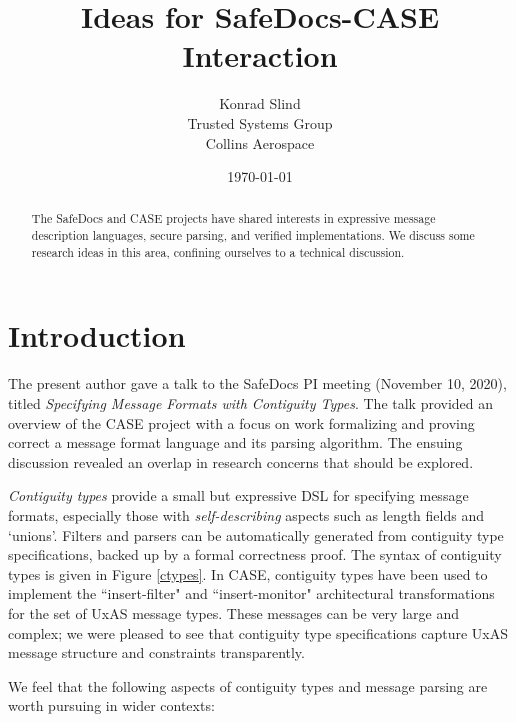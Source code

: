 \documentclass{article}
\theoremstyle{definition}
\begin{document}
\title{Ideas for SafeDocs-CASE Interaction}
\author{Konrad Slind \\ Trusted Systems Group \\ Collins Aerospace}
\date{\today}

\begin{abstract}
The SafeDocs and CASE projects have shared interests in expressive
message description languages, secure parsing, and verified
implementations. We discuss some research ideas in this area,
confining ourselves to a technical discussion.
\end{abstract}

\maketitle

\section*{Introduction}

The present author gave a talk to the SafeDocs PI meeting (November
10, 2020), titled \emph{Specifying Message Formats with Contiguity
  Types}. The talk provided an overview of the CASE project with a
focus on work formalizing and proving correct a message format
language and its parsing algorithm. The ensuing discussion revealed an
overlap in research concerns that should be explored.

\emph{Contiguity types} provide a small but expressive DSL for
specifying message formats, especially those with
\emph{self-describing} aspects such as length fields and
`unions'. Filters and parsers can be automatically generated from
contiguity type specifications, backed up by a formal correctness
proof. The syntax of contiguity types is given in Figure \ref{ctypes}.
In CASE, contiguity types have been used to implement the
``insert-filter" and ``insert-monitor" architectural transformations for
the set of UxAS message types. These messages can be very large and
complex; we were pleased to see that contiguity type specifications
capture UxAS message structure and constraints transparently.

We feel that the following aspects of contiguity types and message
parsing are worth pursuing in wider contexts:
\end{document}
